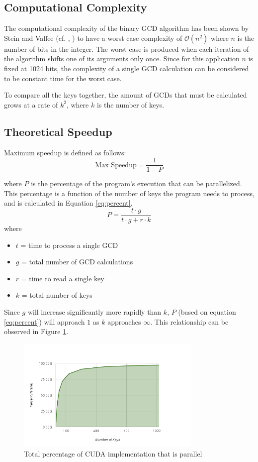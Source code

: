 \documentclass[10pt, conference]{./IEEEtran}
\begin{document}
\subsection{Computational Complexity}
The computational complexity of the binary GCD algorithm has been shown by 
Stein and Vall$\acute{\text{e}}$e (cf. \cite{stein1967computational}, 
\cite{vallee1998complete}) to have a worst case complexity of $\mathcal{O}(n^2)$ 
where $n$ is the number of bits in the integer. The worst case is produced 
when each iteration of the algorithm shifts one of its arguments only once. 
Since for this application $n$ is fixed at 1024 bits, the complexity of a 
single GCD calculation can be considered to be constant time for the worst case.

To compare all the keys together, the amount of GCDs that must be calculated 
grows at a rate of $k^2$, where $k$ is the number of keys.

\subsection{Theoretical Speedup}
Maximum speedup is defined as follows:
\begin{equation}
   \mbox{Max Speedup} = \frac{1}{1 - P}
   \label{eq:speed}
\end{equation}

where $P$ is the percentage of the program's execution that can be parallelized.
This percentage is a function of the number of keys the program needs to 
process, and is calculated in Equation \ref{eq:percent}.
\begin{equation}
P = \frac{t \cdot g}{t \cdot g + r \cdot k}
   \label{eq:percent}
\end{equation}
where
\begin{itemize}
   \item $t$ = time to process a single GCD
   \item $g$ = total number of GCD calculations
   \item $r$ = time to read a single key
   \item $k$ = total number of keys
\end{itemize}

Since $g$ will increase significantly more rapidly than $k$, $P$ (based on 
equation \ref{eq:percent}) will approach $1$ as $k$ approaches 
$\infty$. This relationship can be observed in Figure \ref{fig:parPercent}.

\begin{figure}
   \centering
   \includegraphics[width=3.5in]{chart_7.png}
   \caption{Total percentage of CUDA implementation that is parallel}
   \label{fig:parPercent}
\end{figure}
\end{document}
